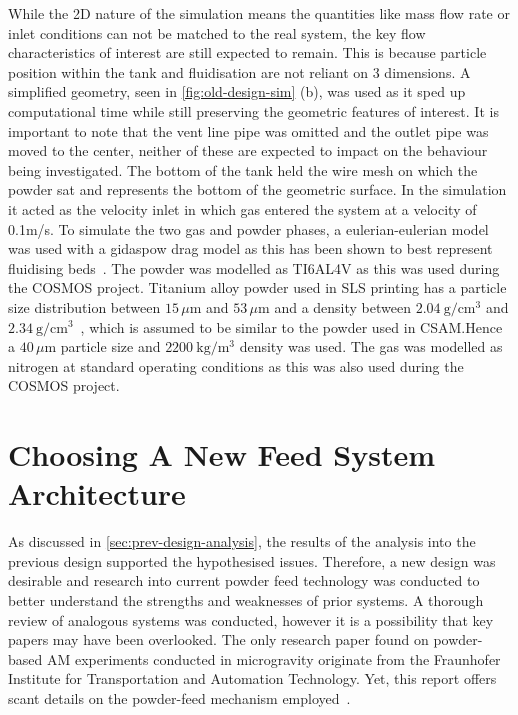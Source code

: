 While the 2D nature of the simulation means the quantities like mass flow rate or inlet conditions can not be matched to the real system, the key flow characteristics of interest are still expected to remain. This is because particle position within the tank and fluidisation are not reliant on 3 dimensions. A simplified geometry, seen in \autoref{fig:old-design-sim} (b), was used as it sped up computational time while still preserving the geometric features of interest. It is important to note that the vent line pipe was omitted and the outlet pipe was moved to the center, neither of these are expected to impact on the behaviour being investigated. The bottom of the tank held the wire mesh on which the powder sat and represents the bottom of the geometric surface. In the simulation it acted as the velocity inlet in which gas entered the system at a velocity of 0.1m/s. To simulate the two gas and powder phases, a eulerian-eulerian model was used with a gidaspow drag model as this has been shown to best represent fluidising beds~\cite{C6RA28615A}. The powder was modelled as TI6AL4V as this was used during the COSMOS project. Titanium alloy powder used in SLS printing has a particle size distribution between $15\,\mu\mathrm{m}$ and $53\,\mu\mathrm{m}$ and a density between $2.04\ \mathrm{g/cm^3}$ and $2.34\ \mathrm{g/cm^3}$~\cite{ma17040952}, which is assumed to be similar to the powder used in CSAM.\@ Hence a $40\,\mu\mathrm{m}$ particle size and $2200\ \mathrm{kg/m^3}$ density was used. The gas was modelled as nitrogen at standard operating conditions as this was also used during the COSMOS project.

\section{Choosing A New Feed System Architecture}\label{sec:system_architecture}
As discussed in \autoref{sec:prev-design-analysis}, the results of the analysis into the previous design supported the hypothesised issues. Therefore, a new design was desirable and research into current powder feed technology was conducted to better understand the strengths and weaknesses of prior systems. A thorough review of analogous systems was conducted, however it is a possibility that key papers may have been overlooked. The only research paper found on powder-based AM experiments conducted in microgravity originate from the Fraunhofer Institute for Transportation and Automation Technology. Yet, this report offers scant details on the powder-feed mechanism employed~\cite{OVERMEYER2025}. 

